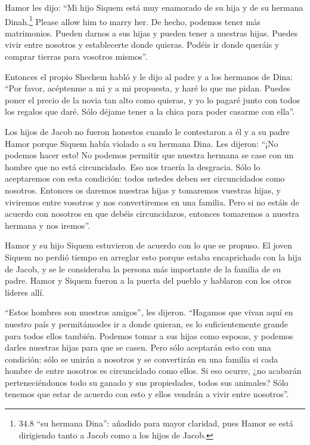  Hamor les dijo: ``Mi hijo Siquem está muy enamorado de su
hija y de su hermana Dinah.\footnote{34.8 ``su hermana Dina'': añadido
  para mayor claridad, pues Hamor se está dirigiendo tanto a Jacob como
  a los hijos de Jacob.} Please allow him to marry her.  De
hecho, podemos tener más matrimonios. Pueden darnos a sus hijas y pueden
tener a nuestras hijas.  Puedes vivir entre nosotros y
establecerte donde quieras. Podéis ir donde queráis y comprar tierras
para vosotros mismos''.

 Entonces el propio Shechem habló y le dijo al padre y a
los hermanos de Dina: ``Por favor, acéptenme a mi y a mi propuesta, y
haré lo que me pidan.  Puedes poner el precio de la novia
tan alto como quieras, y yo lo pagaré junto con todos los regalos que
daré. Sólo déjame tener a la chica para poder casarme con ella''.

 Los hijos de Jacob no fueron honestos cuando le
contestaron a él y a su padre Hamor porque Siquem había violado a su
hermana Dina.  Les dijeron: ``¡No podemos hacer esto! No
podemos permitir que nuestra hermana se case con un hombre que no está
circuncidado. Eso nos traería la desgracia.  Sólo lo
aceptaremos con esta condición: todos ustedes deben ser circuncidados
como nosotros.  Entonces os daremos nuestras hijas y
tomaremos vuestras hijas, y viviremos entre vosotros y nos convertiremos
en una familia.  Pero si no estáis de acuerdo con nosotros
en que debéis circuncidaros, entonces tomaremos a nuestra hermana y nos
iremos''.

 Hamor y su hijo Siquem estuvieron de acuerdo con lo que se
propuso.  El joven Siquem no perdió tiempo en arreglar esto
porque estaba encaprichado con la hija de Jacob, y se le consideraba la
persona más importante de la familia de su padre.  Hamor y
Siquem fueron a la puerta del pueblo y hablaron con los otros líderes
allí.

 ``Estos hombres son nuestros amigos'', les dijeron.
``Hagamos que vivan aquí en nuestro país y permitámosles ir a donde
quieran, es lo suficientemente grande para todos ellos también. Podemos
tomar a sus hijas como esposas, y podemos darles nuestras hijas para que
se casen.  Pero sólo aceptarán esto con una condición: sólo
se unirán a nosotros y se convertirán en una familia si cada hombre de
entre nosotros es circuncidado como ellos.  Si eso ocurre,
¿no acabarán perteneciéndonos todo su ganado y sus propiedades, todos
sus animales? Sólo tenemos que estar de acuerdo con esto y ellos vendrán
a vivir entre nosotros''.

